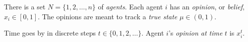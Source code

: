 \documentclass[preview, border={0pt 5pt 0pt 1pt}, varwidth=19.5cm]{standalone} %
\begin{document}

    There is a set \(N = \{1, 2, \dots, n\}\) of \emph{agents}.
    Each agent \(i\) has an \emph{opinion}, or \emph{belief}, \(x_i \in [0,1]\).
    The opinions are meant to track a \emph{true state} \(\mu \in (0, 1)\).
    \vspace{1em}

    Time goes by in discrete steps \(t \in \{0, 1, 2, \dots \}\).
    Agent \(i\)'s \emph{opinion at time} \(t\) is \(x^t_i\).
    \vspace{1em}
\end{document}
